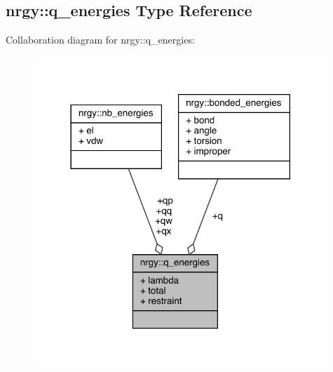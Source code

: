 \hypertarget{structnrgy_1_1q__energies}{\subsection{nrgy\-:\-:q\-\_\-energies Type Reference}
\label{structnrgy_1_1q__energies}
}


Collaboration diagram for nrgy\-:\-:q\-\_\-energies\-:
\nopagebreak
\begin{figure}[H]
\begin{center}
\leavevmode
\includegraphics[width=314pt]{structnrgy_1_1q__energies__coll__graph}
\end{center}
\end{figure}
